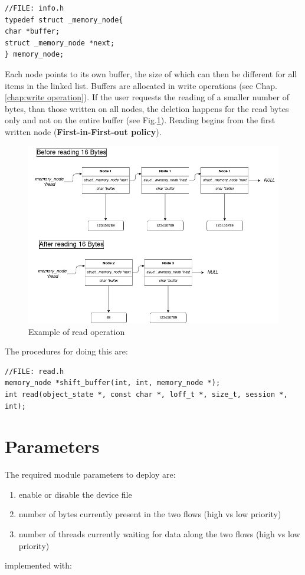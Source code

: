 \documentclass[12pt]{report}
\begin{document}
\begin{lstlisting}
//FILE: info.h
typedef struct _memory_node{
char *buffer;
struct _memory_node *next;
} memory_node;
\end{lstlisting}

Each node points to its own buffer, the size of which can then be different for all items in the linked list. Buffers are allocated in write operations (see Chap.\ref{chap:write operation}). If the user requests the reading of a smaller number of bytes, than those written on all nodes, the deletion happens for the read bytes only and not on the entire buffer (see Fig.\ref{fig:read}). Reading begins from the first written node (\textbf{First-in-First-out policy}). 

\begin{figure}[h]
	\centering
	\includegraphics[scale = .45]{read.jpg}
	\caption{Example of read operation}
	\label{fig:read}
\end{figure}

The procedures for doing this are:

\begin{lstlisting}
//FILE: read.h
memory_node *shift_buffer(int, int, memory_node *);
int read(object_state *, const char *, loff_t *, size_t, session *, int);
\end{lstlisting}

\chapter{Parameters}

The required module parameters to deploy are:

\begin{enumerate}
	\item enable or disable the device file
	\item number of bytes currently present in the two flows (high vs low priority)
	\item number of threads currently waiting for data along the two flows (high vs low priority)
\end{enumerate}
implemented with:
\end{document}
